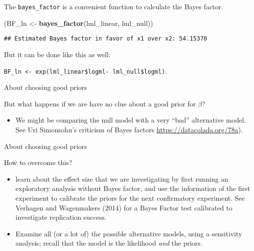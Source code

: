\documentclass[12pt,ignorenonframetext,aspectratio=169]{beamer}
\newenvironment{Shaded}{\begin{snugshade}}{\end{snugshade}}
\newcommand{\KeywordTok}[1]{\textcolor[rgb]{0.13,0.29,0.53}{\textbf{#1}}}
\newcommand{\NormalTok}[1]{#1}
\newcommand{\StringTok}[1]{\textcolor[rgb]{0.31,0.60,0.02}{#1}}
\providecommand{\tightlist}{%
  \setlength{\itemsep}{0pt}\setlength{\parskip}{0pt}}
\begin{document}
\begin{frame}[fragile]

The \texttt{bayes\_factor} is a convenient function to calculate the Bayes factor.

\small
\vspace{1cm}

\begin{Shaded}
\begin{Highlighting}[]
\NormalTok{(BF_ln <-}\StringTok{ }\KeywordTok{bayes_factor}\NormalTok{(lml_linear, lml_null))}
\end{Highlighting}
\end{Shaded}

\begin{verbatim}
## Estimated Bayes factor in favor of x1 over x2: 54.15370
\end{verbatim}

\vspace{2cm}

But it can be done like this as well:

\texttt{BF\_ln\ \textless{}-\ exp(lml\_linear\$logml-\ lml\_null\$logml)}.

\end{frame}

\begin{frame}{About choosing good priors}
\protect\hypertarget{about-choosing-good-priors}{}

But what happens if we are have no clue about a good prior for \(\beta\)?

\begin{itemize}
\tightlist
\item
  We might be comparing the null model with a very ``bad'' alternative model. See Uri Simonsohn's criticism of Bayes factors \url{https://datacolada.org/78a}).
\end{itemize}

\end{frame}

\begin{frame}{About choosing good priors}
\protect\hypertarget{about-choosing-good-priors-1}{}

How to overcome this?

\begin{itemize}
\item
  learn about the effect size that we are investigating by first running an exploratory analysis without Bayes factor, and use the information of the first experiment to calibrate the priors for the next confirmatory experiment. See Verhagen and Wagenmakers (2014) for a Bayes Factor test calibrated to investigate replication success.
\item
  Examine all (or a lot of) the possible alternative models, using a sensitivity analysis; recall that the model is the likelihood \emph{and} the priors.
\end{itemize}

\end{frame}
\end{document}
